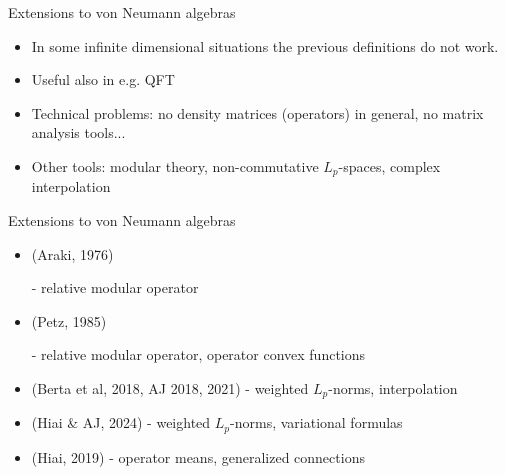 \documentclass[mathserif]{beamer}
\newcommand{\<}{\langle}
\renewcommand{\>}{\rangle}
\begin{document}
\begin{frame}{Extensions to von Neumann algebras}


\begin{itemize}

\item In some infinite dimensional situations the previous definitions do not work.

\vskip 3mm

\item Useful also in e.g. QFT

\vskip 3mm
\item Technical problems: no density matrices (operators) in general, no matrix analysis
tools...

\vskip 3mm

\item Other tools: modular theory, non-commutative $L_p$-spaces, complex interpolation

\end{itemize}


\end{frame}


\begin{frame}{Extensions to von Neumann algebras}





\begin{itemize}

\item {} {\small (Araki, 1976)}

\vskip 2mm
\hskip 3cm - relative modular operator
\vskip 2mm

\item {} {\small (Petz, 1985)}

\vskip 2mm
\hskip 1cm - relative modular operator, operator convex functions
\vskip 2mm

\item {} {\small (Berta et al, 2018, AJ 2018, 2021)}
\vskip 2mm
\hskip 3cm - weighted $L_p$-norms, interpolation
\vskip 2mm

\item {} {\small (Hiai \& AJ, 2024)}
\vskip 2mm
\hskip 3cm - weighted $L_p$-norms, variational formulas
\vskip 2mm
\vskip 3mm

\item {} {\small (Hiai, 2019)}
\vskip 2mm
\hskip 3cm - operator means, generalized connections
\vskip 2mm





\end{itemize}




\end{frame}
\end{document}
